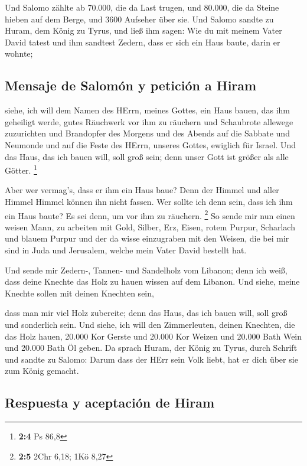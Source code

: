  Und Salomo zählte ab 70.000, die da Last trugen, und
80.000, die da Steine hieben auf dem Berge, und 3600 Aufseher über sie.
 Und Salomo sandte zu Huram, dem König zu Tyrus, und ließ
ihm sagen: Wie du mit meinem Vater David tatest und ihm sandtest Zedern,
dass er sich ein Haus baute, darin er wohnte;

\hypertarget{mensaje-de-salomuxf3n-y-peticiuxf3n-a-hiram}{%
\subsection{Mensaje de Salomón y petición a
Hiram}\label{mensaje-de-salomuxf3n-y-peticiuxf3n-a-hiram}}

 siehe, ich will dem Namen des HErrn, meines Gottes, ein
Haus bauen, das ihm geheiligt werde, gutes Räuchwerk vor ihm zu räuchern
und Schaubrote allewege zuzurichten und Brandopfer des Morgens und des
Abends auf die Sabbate und Neumonde und auf die Feste des HErrn, unseres
Gottes, ewiglich für Israel.  Und das Haus, das ich bauen
will, soll groß sein; denn unser Gott ist größer als alle Götter.
\footnote{\textbf{2:4} Ps 86,8}

 Aber wer vermag's, dass er ihm ein Haus baue? Denn der
Himmel und aller Himmel Himmel können ihn nicht fassen. Wer sollte ich
denn sein, dass ich ihm ein Haus baute? Es sei denn, um vor ihm zu
räuchern. \footnote{\textbf{2:5} 2Chr 6,18; 1Kö 8,27}  So
sende mir nun einen weisen Mann, zu arbeiten mit Gold, Silber, Erz,
Eisen, rotem Purpur, Scharlach und blauem Purpur und der da wisse
einzugraben mit den Weisen, die bei mir sind in Juda und Jerusalem,
welche mein Vater David bestellt hat.

 Und sende mir Zedern-, Tannen- und Sandelholz vom
Libanon; denn ich weiß, dass deine Knechte das Holz zu hauen wissen auf
dem Libanon. Und siehe, meine Knechte sollen mit deinen Knechten sein,

 dass man mir viel Holz zubereite; denn das Haus, das ich
bauen will, soll groß und sonderlich sein.  Und siehe, ich
will den Zimmerleuten, deinen Knechten, die das Holz hauen, 20.000 Kor
Gerste und 20.000 Kor Weizen und 20.000 Bath Wein und 20.000 Bath Öl
geben.  Da sprach Huram, der König zu Tyrus, durch
Schrift und sandte zu Salomo: Darum dass der HErr sein Volk liebt, hat
er dich über sie zum König gemacht.

\hypertarget{respuesta-y-aceptaciuxf3n-de-hiram}{%
\subsection{Respuesta y aceptación de
Hiram}\label{respuesta-y-aceptaciuxf3n-de-hiram}}

